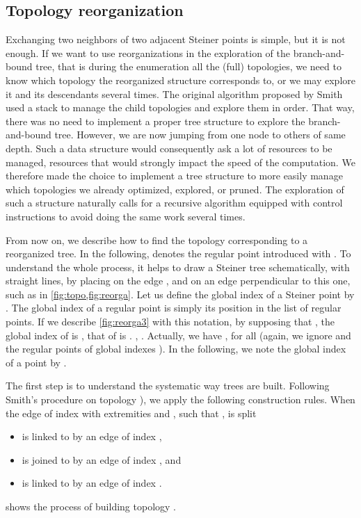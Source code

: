 \documentclass{article}
\theoremstyle{plain}
\begin{document}
\subsection{Topology reorganization}
\label{sec:topreorga}
Exchanging two neighbors of two adjacent Steiner points is simple, but it is not enough. 
If we want to use reorganizations in the exploration of the \mbox{branch-and-bound} tree, that is during the enumeration all the (full) topologies, we need to know which topology the reorganized structure corresponds to, or we may explore it and its descendants several times.
The original algorithm proposed by Smith used a stack to manage the child topologies and explore them in order. 
That way, there was no need to implement a proper tree structure to explore the \mbox{branch-and-bound} tree. 
However, we are now jumping from one node to others of same depth. 
Such a data structure would consequently ask a lot of resources to be managed, resources that would strongly impact the speed of the computation. 
We therefore made the choice to implement a tree structure to more easily manage which topologies we already optimized, explored, or pruned. 
The exploration of such a structure naturally calls for a recursive algorithm equipped with control instructions to avoid doing the same work several times.

From now on, we describe how to find the topology corresponding to a reorganized tree. 
In the following,  denotes the regular point introduced with .
To understand the whole process, it helps to draw a Steiner tree schematically, with straight lines, by placing  on the edge , and  on an edge perpendicular to this one, such as in \cref{fig:topo,fig:reorga}. 
Let us define the global index of a Steiner point  by . 
The global index of a regular point is simply its position in the list of regular points. 
If we describe \cref{fig:reorga3} with this notation, by supposing that , the global index of  is , that of  is . 
, . 
Actually, we have , for all  (again, we ignore  and the regular points of global indexes ). 
In the following, we note the global index of a point  by .

The first step is to understand the systematic way trees are built. 
Following Smith's procedure on topology ), we apply the following construction rules. When the edge of index  with extremities  and , such that , is split
\begin{itemize}
	\item   is linked to  by an edge of index ,
	\item  is joined to  by an edge of index , and
	\item  is linked to  by an edge of index .
\end{itemize}
 shows the process of building topology .
\end{document}

